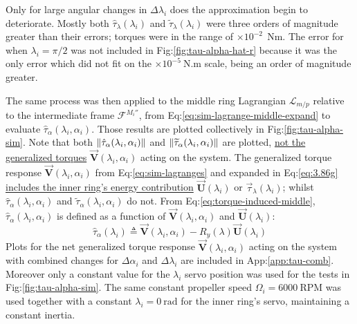 \par
Only for large angular changes in $\Delta\lambda_i$ does the approximation begin to deteriorate. Mostly both $\hat{\tau}_\lambda(\lambda_i)$ and $\tilde{\tau}_\lambda(\lambda_i)$ were three orders of magnitude greater than their errors; torques were in the range of $\times 10^{-2}~~\text{Nm}$. The error for when $\lambda_i=\pi/2$ was not included in Fig:\ref{fig:tau-alpha-hat-r} because it was the only error which did not fit on the $\times 10^{-5}~\text{N.m}$ scale, being an order of magnitude greater.
\par
The same process was then applied to the middle ring Lagrangian $\mathcal{L}_{m/p}$ relative to the intermediate frame $\mathcal{F}^{M_i''}$, from Eq:\ref{eq:sim-lagrange-middle-expand} to evaluate $\hat{\tau}_\alpha(\lambda_i,\alpha_i)$. Those results are plotted collectively in Fig:\ref{fig:tau-alpha-sim}. Note that both $\left\lVert\hat{\tau}_\alpha(\lambda_i,\alpha_i)\right\rVert$ and $\left\lVert\widetilde{\tau}_\alpha(\lambda_i,\alpha_i)\right\rVert$ are plotted, \underline{not the generalized torques} $\vec{\mathbf{V}}(\lambda_i,\alpha_i)$ acting on the system. The generalized torque response $\vec{\mathbf{V}}(\lambda_i,\alpha_i)$ from Eq:\ref{eq:sim-lagranges} and expanded in Eq:\ref{eq:3.86g} \underline{includes the inner ring's energy contribution} $\vec{\mathbf{U}}(\lambda_i)$ or $\vec{\tau}_\lambda(\lambda_i)$; whilst $\hat{\tau}_\alpha(\lambda_i,\alpha_i)$ and $\tilde{\tau}_\alpha(\lambda_i,\alpha_i)$ do not. From Eq:\ref{eq:torque-induced-middle}, $\hat{\tau}_\alpha(\lambda_i,\alpha_i)$ is defined as a function of $\vec{\mathbf{V}}(\lambda_i,\alpha_i)$ and $\vec{\mathbf{U}}(\lambda_i)$:
\begin{equation}
\hat{\tau}_\alpha(\lambda_i)\triangleq \vec{\mathbf{V}}(\lambda_i,\alpha_i)-R_y(\lambda)\vec{\mathbf{U}}(\lambda_i)
\end{equation}
Plots for the net generalized torque response $\vec{\mathbf{V}}(\lambda_i,\alpha_i)$ acting on the system with combined changes for $\Delta\alpha_i$ and $\Delta\lambda_i$ are included in App:\ref{app:tau-comb}. Moreover only a constant value for the $\lambda_i$ servo position was used for the tests in Fig:\ref{fig:tau-alpha-sim}. The same constant propeller speed $\Omega_i=6000~\text{RPM}$ was used together with a constant $\lambda_i=0~\text{rad}$ for the inner ring's servo, maintaining a constant inertia.
\par
